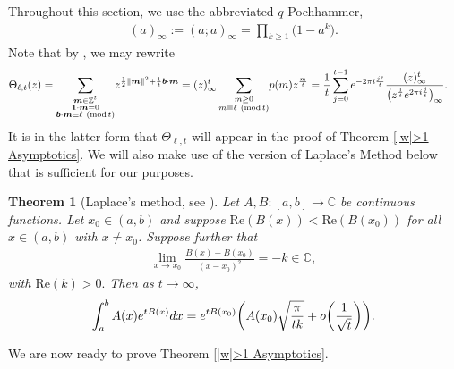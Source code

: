 \documentclass[11pt]{article}
\numberwithin{equation}{section}
\newtheorem{Theorem}{Theorem}[section]
\begin{document}
Throughout this section, we use the abbreviated $q$-Pochhammer,
\begin{align*}
(a)_{\infty}:=(a;a)_{\infty}=\prod_{k \geq 1} \big(1-a^k\big).
\end{align*}
Note that by \cite[equation~(3.1)]{GKS}, we may rewrite
\begin{align*}
 \Theta_{\ell,t}(z)&{}=\sum_{\substack{\boldsymbol{m}\in \mathbb{Z}^t \\ \boldsymbol{1} \cdot \boldsymbol{m}=0 \\ \boldsymbol{b}\cdot \boldsymbol{m} \equiv \ell \ (\text{mod}\, {t}) }} \! z^{\frac{1}{2}\|\boldsymbol{m}\|^2+\frac{1}{t}\boldsymbol{b}\cdot \boldsymbol{m}}
 = (z)_{\infty}^t \sum_{\substack{m \geq 0 \\ m \equiv \ell \ (\text{mod}\, {t})}}\! p(m)z^{\frac{m}{t}}
=\frac{1}{t}\sum_{j=0}^{ t-1}{\rm e}^{-2\pi {\rm i} \frac{j\ell}{t}}\frac{(z)_{\infty}^t}{\big(z^{\frac{1}{t}}{\rm e}^{2\pi {\rm i} \frac{j}{t}}\big)_{\infty}}.
\end{align*}
It is in the latter form that $\Theta_{\ell,t}$ will appear in the proof of Theorem \ref{|w|>1 Asymptotics}. We will also make use of the version of Laplace's Method below that is sufficient for our purposes.
\begin{Theorem}[Laplace's method, see {\cite[Section 1.1.5]{Pinsky}}]\label{T:LaplaceMethod}
 Let $A,B\colon [a,b]\to \mathbb{C}$ be continuous functions. Let $x_0 \in (a,b)$ and suppose $\mathrm{Re}(B(x))<\mathrm{Re}(B(x_0))$ for all $x\in (a,b)$ with $x \neq x_0$. Suppose further that
 \begin{align*}
 \lim_{x\to x_0}\frac{B(x)-B(x_0)}{(x-x_0)^2} = -k\in \mathbb{C},
 \end{align*}
 with $\mathrm{Re}(k)>0.$ Then as $t \to \infty$,
 \begin{align*}
 \int^b_{a}A(x){\rm e}^{tB(x)}{\rm d}x = {\rm e}^{tB(x_0)}\biggl(A(x_0)\sqrt{\frac{\pi}{tk}}+o\biggl(\frac{1}{\sqrt{t}}\biggr)\biggr).
 \end{align*}
\end{Theorem}

We are now ready to prove Theorem \ref{|w|>1 Asymptotics}.
\end{document}
